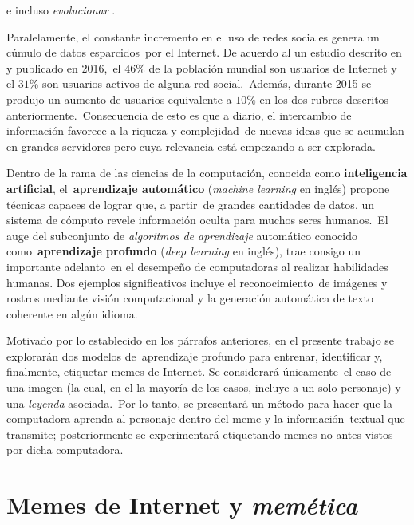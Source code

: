 e incluso \emph{evolucionar} \cite{shifman2014}.\par
Paralelamente, el constante incremento en el uso de redes sociales genera un cúmulo de datos esparcidos\
por el Internet. De acuerdo al un estudio descrito en \cite{website:smartinsights} y publicado en 2016,\
el $46\%$ de la población mundial son usuarios de Internet y el $31\%$ son usuarios activos de alguna red social.\
Además, durante 2015 se produjo un aumento de usuarios equivalente a $10\%$ en los dos rubros descritos anteriormente.\
Consecuencia de esto es que a diario, el intercambio de información favorece a la riqueza y complejidad\
de nuevas ideas que se acumulan en grandes servidores pero cuya relevancia está empezando a ser explorada.\par
Dentro de la rama de las ciencias de la computación, conocida como \textbf{inteligencia artificial}, el\
\textbf{aprendizaje automático} (\emph{machine learning} en inglés) propone técnicas capaces de lograr que, a partir\
de grandes cantidades de datos, un sistema de cómputo revele información oculta para muchos seres humanos.\
El auge del subconjunto de \emph{algoritmos de aprendizaje} automático conocido como\
\textbf{aprendizaje profundo} (\emph{deep learning} en inglés), trae consigo un importante adelanto\
en el desempeño de computadoras al realizar habilidades humanas. Dos ejemplos significativos incluye el reconocimiento\
de imágenes y rostros mediante visión computacional y la generación automática de texto coherente en algún idioma.\par
Motivado por lo establecido en los párrafos anteriores, en el presente trabajo se explorarán dos modelos de\
aprendizaje profundo para entrenar, identificar y, finalmente, etiquetar memes de Internet. Se considerará únicamente\
el caso de una imagen (la cual, en el la mayoría de los casos, incluye a un solo personaje) y una \emph{leyenda} asociada.\
Por lo tanto, se presentará un método para hacer que la computadora aprenda al personaje dentro del meme y la información\
textual que transmite; posteriormente se experimentará etiquetando memes no antes vistos por dicha computadora.

\section{Memes de Internet y \emph{memética}}

